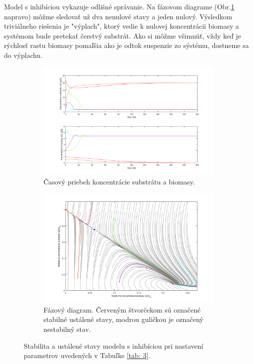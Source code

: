 Model s inhibíciou vykazuje odlišné správanie. Na fázovom diagrame (Obr.\ref{fig:5} napravo) môžme sledovať už dva nenulové stavy a jeden nulový. Výsledkom triviálneho riešenia je "výplach", ktorý vedie k nulovej koncentrácii biomasy a systémom bude pretekať čerstvý substrát. Ako si môžme všimnúť, vždy keď je rýchlosť rastu biomasy pomaľšia
ako je odtok suspenzie zo sýstému, dostneme sa do výplachu.

\begin{figure}
	\begin{subfigure}{.5\textwidth}
		\centering
		\includegraphics[width=1\linewidth]{images/init_cond_inhb}
		\caption[]{Časový priebeh koncentrácie substrátu a biomasy.}
	\end{subfigure}
	\begin{subfigure}{.5\textwidth}
		\centering
		\includegraphics[width=1\linewidth]{images/phase_inhb}
		\caption[]{Fázový diagram. Červeným štvorčekom sú označené stabilné ustálené stavy, modrou guličkou je označený nestabilný stav.}
	\end{subfigure}
	\caption{Stabilita a ustálené stavy modelu s inhibíciou pri nastavení parametrov uvedených v Tabuľke \ref{tab: 3}.}
	\label{fig:5}
\end{figure}

